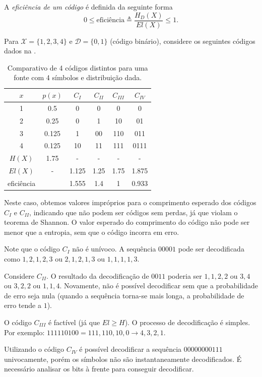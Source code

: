 \begin{definition}
  A \emph{eficiência de um código} é definida da seguinte forma
    \begin{equation}
      0 \leq \text{eficiência} \triangleq \frac{H_D(X)}{E l(X)} \leq 1 .
    \end{equation}
\end{definition}

\begin{example}
  Para $\mathcal{X} = \{1,2,3,4\}$ e $\mathcal{D}=\{0,1\}$ (código binário), considere os seguintes códigos
  dados na .
  \begin{table}[h]
    \centering
    \caption{Comparativo de 4 códigos distintos para uma fonte com 4 símbolos e distribuição dada.}\label{tb:excode3}
    \begin{tabular}{c|c|c|c|c|c}
    $x$           & $p(x)$& $C_I$ & $C_{II}$ & $C_{III}$ & $C_{IV}$ \\ \hline
    1             & 0.5   &  0    &   0   &  0            &   0   \\
    2             & 0.25  &  0    &   1   & 10            &  01   \\
    3             & 0.125 &  1    &  00   & 110           & 011   \\
    4             & 0.125 & 10    &  11   & 111           & 0111  \\
    $H(X)$        & 1.75  &  -    &  -    &  -            &  -    \\
    $El(X)$       &  -    & 1.125 & 1.25  &  1.75         & 1.875 \\
    eficiência    &       & 1.555 & 1.4   & 1             & 0.933 
    \end{tabular}
  \end{table}
  Neste caso, obtemos valores impróprios para o comprimento esperado dos códigos $C_I$ e $C_{II}$,
  indicando que não podem ser códigos sem perdas, já que violam o teorema de Shannon.
  O valor esperado do comprimento do código não pode ser menor que a entropia, sem que o código incorra em erro.

  Note que o código $C_I$ não é unívoco. A sequência $00001$ pode ser decodificada como
  $1,2,1,2,3$ ou $2,1,2,1,3$ ou $1,1,1,1,3$.

  Considere $C_{II}$. O resultado da decodificação de $0011$ poderia ser $1,1,2,2$ ou $3,4$ ou $3,2,2$ ou $1,1,4$.
  Novamente, não é possível decodificar sem que a probabilidade de erro seja nula (quando a sequência torna-se mais longa, a probabilidade de erro tende a $1$).

  O código $C_{III}$ é factível (já que $El \geq H$). O processo de decodificação é simples. Por exemplo: $111110100 = 111,110,10,0 \rightarrow 4,3,2,1$.

  Utilizando o código $C_{IV}$ é possível decodificar a sequência $00000000111$
  univocamente, porém os símbolos não são instantaneamente decodificados. É
  necessário analisar os bits à frente para conseguir decodificar.
\end{example}


